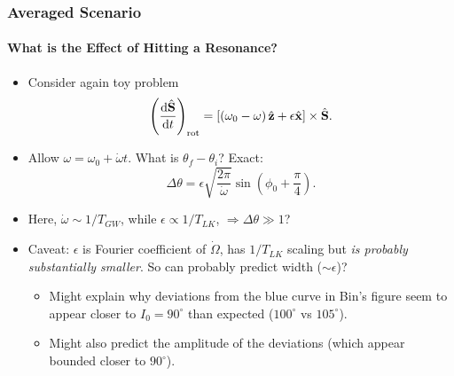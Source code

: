 \documentclass[dvipsnames, 8pt]{beamer}
\newcommand*{\rd}[2]{\frac{\mathrm{d}#1}{\mathrm{d}#2}}
\newcommand*{\bm}[1]{\boldsymbol{\mathbf{#1}}}
\newcommand*{\uv}[1]{\hat{\bm{#1}}}
\newcommand*{\p}[1]{\left(#1\right)}
\newcommand*{\s}[1]{\left[#1\right]}
\begin{document}
\begin{frame}
    \frametitle{Averaged Scenario}
    \framesubtitle{What is the Effect of Hitting a Resonance?}

    \begin{itemize}
        \item Consider again toy problem
            \begin{equation}
                \p{\rd{\uv{S}}{t}}_{\rm rot} =
                    \s{\p{\omega_0 - \omega}\uv{z} + \epsilon
                        \uv{x}} \times \uv{S}.
            \end{equation}

        \item Allow $\omega = \omega_0 + \dot{\omega}t$. What is $\theta_f -
            \theta_i$? Exact:
            \begin{equation}
                \Delta \theta = \epsilon \sqrt{\frac{2\pi}{\dot{\omega}}}
                    \sin \p{\phi_0 + \frac{\pi}{4}}.
            \end{equation}

        \item Here, $\dot{\omega} \sim 1 / T_{GW}$, while $\epsilon \propto 1 /
            T_{LK}$, $\Rightarrow \Delta \theta \gg 1$?

        \item Caveat: $\epsilon$ is Fourier coefficient of $\dot{\Omega}$, has
            $1/T_{LK}$ scaling but \emph{is probably substantially smaller}. So
            can probably predict width ($\sim \epsilon$)?

        \begin{itemize}
            \item Might explain why deviations from the blue curve in Bin's
                figure seem to appear closer to $I_0 = 90^\circ$ than expected
                ($100^\circ$ vs $105^\circ$).

            \item Might also predict the amplitude of the deviations (which
                appear bounded closer to $90^\circ$).
        \end{itemize}
    \end{itemize}
\end{frame}
\end{document}

